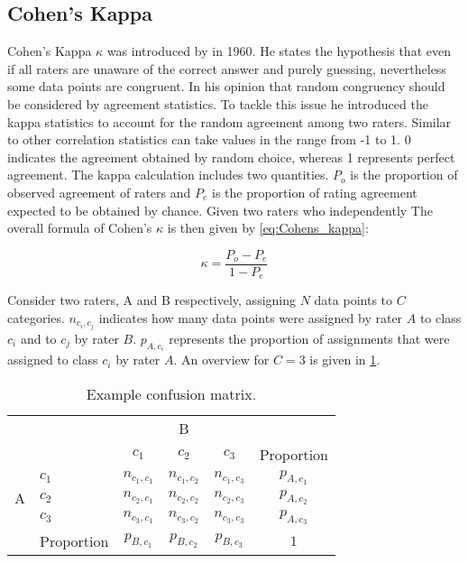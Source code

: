 \subsection{Cohen's Kappa}
\label{chp:fundamentals:sec:inter_rater_agreement:subsec:cohens_kappa}
Cohen's Kappa $\kappa$ was introduced by \textcite{Cohen:1960} in 1960.
He states the hypothesis that even if all raters are unaware of the correct answer and purely guessing, nevertheless some data points are congruent.
In his opinion that random congruency should be considered by agreement statistics.
To tackle this issue he introduced the kappa statistics to account for the random agreement among two raters.
Similar to other correlation statistics can take values in the range from -1 to 1.
0 indicates the agreement obtained by random choice, whereas 1 represents perfect agreement.
The kappa calculation includes two quantities.
$P_o$ is the proportion of observed agreement of raters and $P_e$ is the proportion of rating agreement expected to be obtained by chance.
Given two raters who independently
The overall formula of Cohen's $\kappa$ is then given by \cref{eq:Cohens_kappa}:

\begin{equation}\label{eq:Cohens_kappa}
    \kappa = \frac{P_o - P_e}{1 - P_e}
\end{equation}

Consider two raters, A and B respectively, assigning $N$ data points to $C$ categories.
$n_{c_i, c_j}$ indicates how many data points were assigned by rater $A$ to class $c_i$ and to $c_j$ by rater $B$.
$p_{A, c_i}$ represents the proportion of assignments that were assigned to class $c_i$ by rater $A$.
An overview for $C=3$ is given in \cref{tab:cohens_kappa_sample_definition}.

\begin{table}[htpb]
    \centering
    \begin{tabular}{l|l|c|c|c|c}
        \multicolumn{2}{c}{}&\multicolumn{3}{c}{B}&\\
        \cline{3-5}
        \multicolumn{2}{c|}{}&$c_1$&$c_2$&$c_3$&\multicolumn{1}{c}{Proportion}\\
        \cline{2-5}
        \multirow{3}{*}{A}& $c_1$ & $n_{c_1, c_1}$ & $n_{c_1, c_2}$ &$n_{c_1, c_3}$& $p_{A, c_1}$\\
        \cline{2-5}
        & $c_2$ & $n_{c_2, c_1}$ & $n_{c_2, c_2}$ &$n_{c_2, c_3}$&$p_{A, c_2}$\\
        \cline{2-5}
        & $c_3$ & $n_{c_3, c_1}$ & $n_{c_3, c_2}$ &$n_{c_3, c_3}$ & $p_{A, c_3}$\\
        \cline{2-5}
        \multicolumn{1}{c}{} & \multicolumn{1}{c}{Proportion} & \multicolumn{1}{c}{$p_{B, c_1}$} & \multicolumn{1}{c}{$p_{B, c_2}$} & \multicolumn{1}{c}{$p_{B, c_3}$} & \multicolumn{1}{c}{$1$}\\
    \end{tabular}
    \caption[Cohen's Kappa notation overview]{Example confusion matrix.}\label{tab:cohens_kappa_sample_definition}
\end{table}


